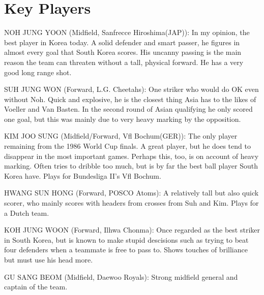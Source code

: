 \section{Key Players}
NOH JUNG YOON (Midfield, Sanfrecce Hiroshima(JAP)):
In my opinion, the best player in Korea today. A solid defender and smart 
passer, he figures in almost every goal that South Korea scores. His uncanny 
passing is the main reason the team can threaten without a tall, physical 
forward. He has a very good long range shot.

SUH JUNG WON (Forward, L.G. Cheetahs): 
One striker who would do OK even without Noh. Quick and explosive, he is the 
closest thing Asia has to the likes of Voeller and Van Basten. In the second 
round of Asian qualifying he only scored one goal, but this was mainly due to
very heavy marking by the opposition.

KIM JOO SUNG (Midfield/Forward, Vfl Bochum(GER)): 
The only player remaining from the 1986 World Cup finals. A great player, but 
he does tend to disappear in the most important games. Perhaps this, too, is 
on account of heavy marking. Often tries to dribble too much, but is by far 
the best ball player South Korea have. Plays for Bundesliga II's Vfl Bochum.

HWANG SUN HONG (Forward, POSCO Atoms): 
A relatively tall but also quick scorer, who mainly scores with headers from
crosses from Suh and Kim. Plays for a Dutch team.

KOH JUNG WOON (Forward, Ilhwa Chonma):
Once regarded as the best striker in South Korea, but is known to make stupid 
descisions such as trying to beat four defenders when a teammate is free to 
pass to. Shows touches of brilliance but must use his head more.

GU SANG BEOM (Midfield, Daewoo Royals): 
Strong midfield general and captain of the team.
